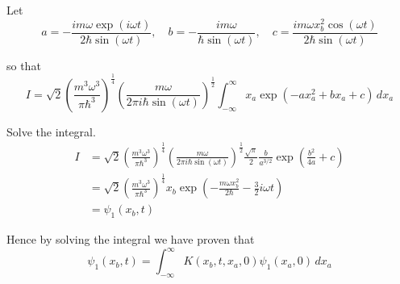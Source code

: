 Let
\begin{equation*}
a=-\frac{im\omega\exp(i\omega t)}{2\hbar\sin(\omega t)},\quad
b=-\frac{im\omega}{\hbar\sin(\omega t)},\quad
c=\frac{im\omega x_b^2\cos(\omega t)}{2\hbar\sin(\omega t)}
\end{equation*}

so that
\begin{equation*}
I=\sqrt2\left(\frac{m^3\omega^3}{\pi\hbar^3}\right)^\frac{1}{4}
\left(\frac{m\omega}{2\pi i\hbar\sin(\omega t)}\right)^\frac{1}{2}
\int_{-\infty}^\infty
x_a\exp(-ax_a^2+bx_a+c)\,dx_a
\end{equation*}

Solve the integral.
\begin{align*}
I&=\sqrt2\left(\frac{m^3\omega^3}{\pi\hbar^3}\right)^\frac{1}{4}
\left(\frac{m\omega}{2\pi i\hbar\sin(\omega t)}\right)^\frac{1}{2}
\frac{\sqrt\pi}{2}\frac{b}{a^{3/2}}\exp\left(\frac{b^2}{4a}+c\right)
\\
&=\sqrt2\left(\frac{m^3\omega^3}{\pi\hbar^3}\right)^\frac{1}{4}
x_b\exp\left(-\frac{m\omega x_b^2}{2\hbar}-\tfrac{3}{2}i\omega t\right)
\\
&=\psi_1(x_b,t)
\end{align*}

Hence by solving the integral we have proven that
\begin{equation*}
\psi_1(x_b,t)=\int_{-\infty}^\infty K(x_b,t,x_a,0)\psi_1(x_a,0)\,dx_a
\end{equation*}


